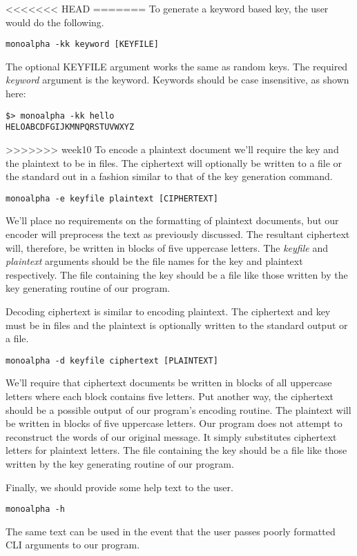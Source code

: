 \documentclass[]{tufte-handout}
\begin{document}
<<<<<<< HEAD
=======
To generate a keyword based key, the user would do the following.
\begin{verbatim}
monoalpha -kk keyword [KEYFILE]
\end{verbatim}
The optional KEYFILE argument works the same as random keys. The required \textit{keyword} argument is the keyword. Keywords should be case insensitive, as shown here:
\begin{verbatim}
$> monoalpha -kk hello
HELOABCDFGIJKMNPQRSTUVWXYZ
\end{verbatim}

>>>>>>> week10
To encode a plaintext document we'll require the key and the plaintext to be in files.  The ciphertext will optionally be written to a file or the standard out in a fashion similar to that of the key generation command.
\begin{verbatim}
monoalpha -e keyfile plaintext [CIPHERTEXT]
\end{verbatim}
We'll place no requirements on the formatting of plaintext documents, but our encoder will preprocess the text as previously discussed. The resultant ciphertext will, therefore, be written in blocks of five uppercase letters. The \textit{keyfile} and \textit{plaintext} arguments should be the file names for the key and plaintext respectively. The file containing the key should be a file like those written by the key generating routine of our program.

Decoding ciphertext is similar to encoding plaintext. The ciphertext and key must be in files and the plaintext is optionally written to the standard output or a file. 
\begin{verbatim}
monoalpha -d keyfile ciphertext [PLAINTEXT]
\end{verbatim}
We'll require that ciphertext documents be written in blocks of all uppercase letters where each block contains five letters.  Put another way, the ciphertext should be a possible output of our program's encoding routine.  The plaintext will be written in blocks of five uppercase letters. Our program does not attempt to reconstruct the words of our original message. It simply substitutes ciphertext letters for plaintext letters. The file containing the key should be a file like those written by the key generating routine of our program.

Finally, we should provide some help text to the user.
\begin{verbatim}
monoalpha -h
\end{verbatim}
The same text can be used in the event that the user passes poorly formatted CLI arguments to our program.
\end{document}
